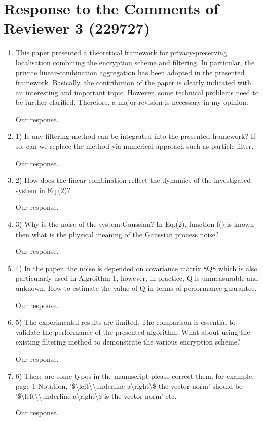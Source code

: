 \documentclass[a4paper]{scrartcl}
\newenvironment{rebuttal}{\begin{enumerate}[label={\color{grey}\thesection.\arabic{enumi}},leftmargin=0pt,ref=\thesection.\arabic{enumi}]}{\end{enumerate}}
\newcommand{\reviewtext}[1]{{\color{nblue} #1}}
\begin{document}
\section*{Response to the Comments of Reviewer 3 (229727)}
\def\thesection{R3}
\begin{rebuttal}
\item \reviewtext{This paper presented a theoretical framework for privacy-preserving localisation combining the encryption scheme and filtering. In particular, the private linear-combination aggregation has been adopted in the presented framework. Basically, the contribution of the paper is clearly indicated with an interesting and important topic. However, some technical problems need to be further clarified. Therefore, a major revision is necessary in my opinion.}

Our response.

\item \reviewtext{1) Is any filtering method can be integrated into the presented framework? If so, can we replace the method via numerical approach such as particle filter.}

Our response.

\item \reviewtext{2) How does the linear combination reflect the dynamics of the investigated system in Eq.(2)?}

Our response.

\item \reviewtext{3) Why is the noise of the system Gaussian? In Eq.(2), function f() is known then what is the physical meaning of the Gaussian process noise?}

Our response.

\item \reviewtext{4) In the paper, the noise is depended on covariance matrix \$Q\$ which is also particularly used in Algroithm 1, however, in practice, Q is unmeasurable and unknown. How to estimate the value of Q in terms of performance guarantee.}

Our response.

\item \reviewtext{5) The experimental results are limited. The comparison is essential to validate the performance of the presented algorithm. What about using the existing filtering method to demonstrate the various encryption scheme?}

Our response.

\item \reviewtext{6) There are some typos in the manuscript please correct them, for example, page 1 Notation, '\$\textbackslash left\textbackslash\textbar\textbackslash underline a\textbackslash right\textbackslash\textbar\$ the vector norm' should be '\$\textbackslash left\textbackslash\textbar\textbackslash underline a\textbackslash right\textbackslash\textbar\$ is the vector norm' etc.}

Our response.

\end{rebuttal}

% 
\end{document}
